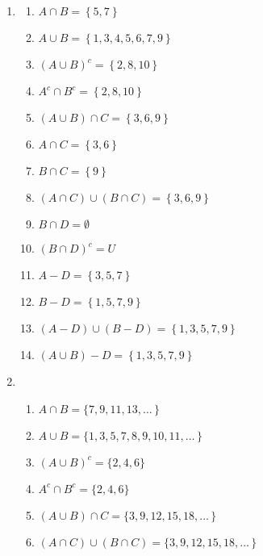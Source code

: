 \begin{enumerate}
\item \begin{multicols}{2}
\begin{enumerate}
  \item $A \cap B = \left\{ 5, 7 \right\}$
  \item $A \cup B = \left\{ 1, 3, 4, 5, 6, 7, 9 \right\}$
  \item $\left( {A \cup B} \right)^c = \left\{ 2, 8, 10 \right\}$
  \item $A^c  \cap B^c = \left\{ 2, 8, 10 \right\}$
  \item $( {A \cup B} ) \cap C = \left\{ {3, 6, 9} \right\}$
  \item $A \cap C = \left\{ 3, 6 \right\}$
  \item $B \cap C = \left\{ 9 \right\}$
  \item $( {A \cap C} ) \cup ( {B \cap C} ) = \left\{ 3, 6, 9 \right\}$
  \item $B \cap D = \emptyset$
  \item $\left( {B \cap D} \right)^c = U$
  \item $A - D = \left\{ 3, 5, 7 \right\}$
  \item $B - D = \left\{ 1, 5, 7, 9 \right\}$
\end{enumerate}
\end{multicols}
\begin{enumerate} \setcounter{enumii}{12}
  \item $\left( {A - D} \right) \cup \left( {B - D} \right) = \left\{ 1, 3, 5, 7, 9 \right\}$
  \item $\left( {A \cup B} \right) - D = \left\{ 1, 3, 5, 7, 9 \right\}$
\end{enumerate}


\item \begin{enumerate}
\item $A \cap B = \{7, 9, 11, 13, \ldots \, \}$

\item $A \cup B = \{1, 3, 5, 7, 8, 9, 10, 11, \ldots \, \}$

\item $(A \cup B)^c = \{2, 4, 6 \}$

\item $A^c \cap B^c = \{2, 4, 6 \}$

\item $( {A \cup B} ) \cap C = \{3, 9, 12, 15, 18, \ldots \, \}$

\item $( {A \cap C} ) \cup ( {B \cap C} ) = \{3, 9, 12, 15, 18, \ldots \, \}$


\end{enumerate}
\end{enumerate}
